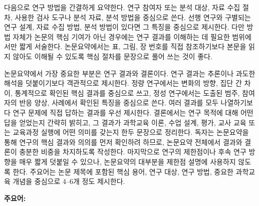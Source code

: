 다음으로 연구 방법을 간결하게 요약한다.
연구 참여자 또는 분석 대상, 자료 수집 절차, 사용한 검사 도구나 분석 자료, 분석 방법을 중심으로 쓴다.
선행 연구와 구별되는 연구 설계, 자료 수집 방법, 분석 방법이 있다면 그 특징을 중심으로 제시한다.
다만 방법 자체가 논문의 핵심 기여가 아닌 경우에는 연구 결과를 이해하는 데 필요한 범위에서만 짧게 서술한다.
논문요약에서는 표, 그림, 장 번호를 직접 참조하기보다 본문을 읽지 않아도 이해될 수 있도록 핵심 절차를 문장으로 풀어 쓰는 것이 좋다.

논문요약에서 가장 중요한 부분은 연구 결과와 결론이다.
연구 결과는 추론이나 과도한 해석을 덧붙이기보다 객관적으로 제시한다.
정량 연구에서는 변화의 방향, 집단 간 차이, 통계적으로 확인된 핵심 결과를 중심으로 쓰고, 정성 연구에서는 도출된 범주, 참여자의 반응 양상, 사례에서 확인된 특징을 중심으로 쓴다.
여러 결과를 모두 나열하기보다 연구 문제에 직접 답하는 결과를 우선 제시한다.
결론에서는 연구 목적에 대해 어떤 답을 얻었는지 간략히 밝히고, 그 결과가 과학교육 이론, 수업 설계, 평가, 교사 교육 또는 교육과정 실행에 어떤 의미를 갖는지 한두 문장으로 정리한다.
독자는 논문요약을 통해 연구의 핵심 결과와 의의를 먼저 확인하려 하므로, 논문요약 전체에서 결과와 결론이 충분한 비중을 차지하도록 작성한다.
마지막으로 연구의 제한점이나 후속 연구 방향을 매우 짧게 덧붙일 수 있으나, 논문요약의 대부분을 제한점 설명에 사용하지 않도록 한다.
주요어는 논문 제목에 포함된 핵심 용어, 연구 대상, 연구 방법, 중요한 과학교육 개념을 중심으로 4--6개 정도 제시한다.

\vskip 0.5cm
\noindent
\textbf{주요어:} \thesiskeywordsKor

\vfill

\endgroup
\endgroup

\newpage
